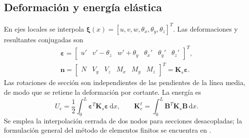 \documentclass[oneside,a4paper,spanish,links,pagenumbers]{amca}
\newcommand{\dd}{\mathrm{d}}
\begin{document}
\subsection{Deformación y energía elástica}
En ejes locales se interpola $\bm\xi(x)=[u,v,w,\theta_x,\theta_y,\theta_z]^T$. Las deformaciones y resultantes conjugadas son
\begin{equation}
\begin{gathered}
\bm\varepsilon=
\begin{bmatrix}u'&v'-\theta_z&w'+\theta_y&\theta_x'&\theta_y'&\theta_z'\end{bmatrix}^T,
\\
\bm n=\begin{bmatrix}N&V_y&V_z&M_x&M_y&M_z\end{bmatrix}^T
=\bm K_s\bm\varepsilon.
\end{gathered}
\end{equation}
Las rotaciones de sección son independientes de las pendientes de la línea media, de modo que se retiene la deformación por cortante. La energía es
\begin{equation}
U_e=\frac12\int_0^L\bm\varepsilon^T\bm K_s\bm\varepsilon\,\dd x,
\qquad \bm K_e^\ell=\int_0^L\bm B^T\bm K_s\bm B\,\dd x.
\end{equation}
Se emplea la interpolación cerrada de dos nodos para secciones desacopladas; la formulación general del método de elementos finitos se encuentra en \citet{reddy2006}.
\end{document}
